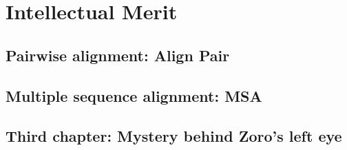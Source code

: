 \section{Intellectual Merit}
\subsection{Pairwise alignment: Align Pair}
\subsection{Multiple sequence alignment: MSA}
\subsection{Third chapter: Mystery behind Zoro's left eye}

